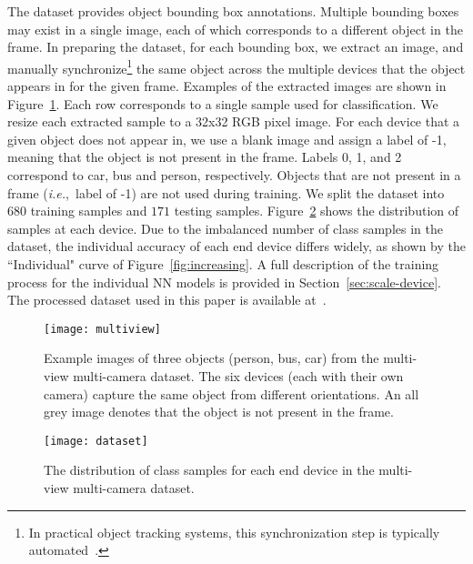 \documentclass[10pt, conference, compsocconf]{IEEEtran}
\newcommand{\ie}{\emph{i.e.}}
\begin{document}
The dataset provides object bounding box annotations. Multiple bounding boxes may exist in a single image, each of which corresponds to a different object in the frame. In preparing the dataset, for each bounding box, we extract an image, and manually synchronize\footnote{In practical object tracking systems, this synchronization step is typically automated~\cite{li2013survey}.} the same object across the multiple devices that the object appears in for the given frame. Examples of the extracted images are shown in Figure~\ref{fig:multiview}. Each row corresponds to a single sample used for classification. We resize each extracted sample to a 32x32 RGB pixel image. For each device that a given object does not appear in, we use a blank image and assign a label of -1, meaning that the object is not present in the frame. Labels 0, 1, and 2 correspond to car, bus and person, respectively. Objects that are not present in a frame (\ie,~label of -1) are not used during training. We split the dataset into $680$ training samples and $171$ testing samples. Figure~\ref{fig:dataset} shows the distribution of samples at each device. Due to the imbalanced number of class samples in the dataset, the individual accuracy of each end device differs widely, as shown by the ``Individual" curve of Figure~\ref{fig:increasing}. A full description of the training process for the individual NN models is provided in Section~\ref{sec:scale-device}. The processed dataset used in this paper is available at~\cite{mvmc}.

\begin{figure}
    \centering
    \texttt{[image: multiview]}
    \caption{Example images of three objects (person, bus, car) from the multi-view multi-camera dataset. The six devices (each with their own camera) capture the same object from different orientations. An all grey image denotes that the object is not present in the frame.}
    \label{fig:multiview}
\end{figure}


\begin{figure}
    \centering
    \texttt{[image: dataset]}
    \caption{The distribution of class samples for each end device in the multi-view multi-camera dataset.}
    \label{fig:dataset}
\end{figure}
\end{document}

